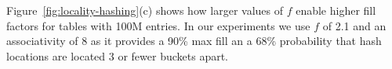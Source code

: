 Figure~\ref{fig:locality-hashing}(c) shows how larger values of $f$
enable higher fill factors for tables with 100M entries.  In
our experiments we use $f$ of 2.1 and an associativity of 8
as it provides a 90\% max fill an a 68\% probability that
hash locations are located 3 or fewer buckets apart.






